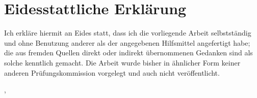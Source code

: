 \chapter*{Eidesstattliche Erklärung}
\label{sec:declaration}
\thispagestyle{empty}

Ich erkläre hiermit an Eides statt, dass ich die vorliegende Arbeit selbstständig und ohne Benutzung anderer als der angegebenen Hilfsmittel angefertigt habe; die aus fremden Quellen direkt oder indirekt übernommenen Gedanken sind als solche kenntlich gemacht. Die Arbeit wurde bisher in ähnlicher Form keiner anderen Prüfungskommission vorgelegt und auch nicht veröffentlicht.

\bigskip
\bigskip
\bigskip
\bigskip

\begin{multicols}{2}
    \raggedright
    \thesisUniversityCity, \thesisDate

    \raggedleft
    \thesisAuthor
\end{multicols}
